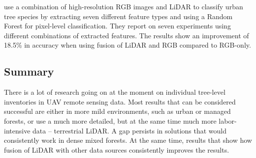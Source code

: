 \citet{wuFineClassificationUrban2024} use a combination of high-resolution RGB images and LiDAR to classify urban tree species by extracting seven different feature types and using a Random Forest for pixel-level classification.
They report on seven experiments using different combinations of extracted features.
The results show an improvement of 18.5\% in accuracy when using fusion of LiDAR and RGB compared to RGB-only.

\subsection{Summary}

There is a lot of research going on at the moment on individual tree-level inventories in UAV remote sensing data.
Most results that can be considered successful are either in more mild environments, such as urban or managed forests, or use a much more detailed, but at the same time much more labor-intensive data – terrestrial LiDAR.
A gap persists in solutions that would consistently work in dense mixed forests.
At the same time, results that show how fusion of LiDAR with other data sources consistently improves the results.